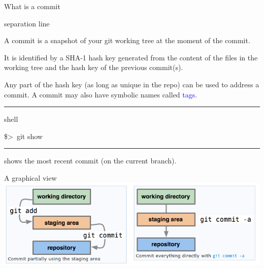 \documentclass{beamer}
\newenvironment{shell}{%
\footnotesize\flushleft\hrule height 0.1ex
\tt\begin{beamercolorbox}[sep=1ex,left]{shell}%
}{%
\end{beamercolorbox}
\hrule height 0.1ex
\endflushleft\par
}
\newcommand*{\psone}[1][ant]{\$>~}
\newcommand{\titleline}[1][0.025cm]{%
\begin{beamercolorbox}[wd=\paperwidth,ht=#1,center]{separation line}%
\end{beamercolorbox}%
}
\begin{document}
\begin{frame}{What is a commit}
\titleline
A commit is a \alert{snapshot of your git working tree at the moment of the commit.}

It is identified by a SHA-1 hash key generated from the content of the files in the working tree and the hash key of the previous commit(s).

Any part of the hash key (as long as unique in the repo) can be used to address a commit. A commit may also have symbolic names called \textcolor{blue}{tags}.

\begin{shell}
\psone git show 
\end{shell}
shows the most recent commit (on the current branch).
\end{frame}

\begin{frame}{A graphical view}
\includegraphics[width=\textwidth]{figures/commit}
\end{frame}
\end{document}

